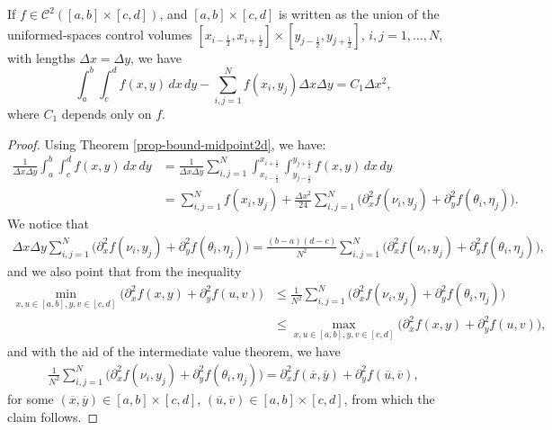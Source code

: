 \begin{corollary}
	\label{anexo-mdp-2d}
	If $f\in \mathcal{C}^2([a,b]\times[c,d])$, and $[a,b]\times[c,d]$ is written
	as the union of the uniformed-spaces control volumes $[x_{i-\frac{1}{2}},x_{i+\frac{1}{2}}] \times  [y_{j-\frac{1}{2}},y_{j+\frac{1}{2}}]$,
	$i,j=1, \ldots, N$,
	with lengths $\Delta x= \Delta y$, we have
	\begin{equation}
	\int_{a}^{b}\int_{c}^{d}
	{f(x,y)\,dx \,dy}-\sum_{i,j=1}^Nf(x_i,y_j) {\Delta x \Delta y} = C_1 \Delta x^2, 
\end{equation}
where $C_1$ depends only on $f$.
\end{corollary}
\begin{proof}
Using Theorem \ref{prop-bound-midpoint2d}, we have:
\begin{align*}
\frac{1}{\Delta x \Delta y}
\int_{a}^{b}\int_{c}^{d} {f(x,y)\,dx \,dy} &=
\frac{1}{\Delta x \Delta y} \sum_{i,j=1}^N
\int_{x_{i-\frac{1}{2}}}^{x_{i+\frac{1}{2}}}
\int_{y_{j-\frac{1}{2}}}^{y_{j+\frac{1}{2}}} {f(x,y)\,dx \,dy}\\
 &= 
\sum_{i,j=1}^N {f(x_i,y_j)} +
\frac{\Delta x^2}{24} \sum_{i,j=1}^N  \bigg({\partial^2_x f(\nu_i,y_j)}+{\partial^2_y f(\theta_i, \eta_j)}\bigg).
\end{align*}
We notice that
\begin{align*}
{\Delta x \Delta y}
\sum_{i,j=1}^N \bigg(\partial^2_x f(\nu_i,y_j)+\partial^2_y f(\theta_i, \eta_j)\bigg) = 
\frac{(b-a)(d-c)}{N^2}
\sum_{i,j=1}^N \bigg(\partial^2_x f(\nu_i,y_j)+\partial^2_y f(\theta_i, \eta_j)\bigg),
\end{align*}
and we also point that from the inequality
\begin{align*}
	\min_{x,u\in[a,b], y,v\in[c,d]}{ \big(\partial^2_x f(x,y) +\partial^2_y f(u,v)\big)}&\leq
	\frac{1}{N^2}
	\sum_{i,j=1}^N \bigg(\partial^2_x f(\nu_i,y_j)+\partial^2_y f(\theta_i, \eta_j)\bigg) \\
	&\leq \max_{x,u\in[a,b], y,v\in[c,d]}{ \big(\partial^2_x f(x,y) +\partial^2_y f(u,v) \big)} ,
\end{align*}
and with the aid of the intermediate value theorem, we have
\begin{align*}
	\frac{1}{N^2}
	\sum_{i,j=1}^N \bigg(\partial^2_x f(\nu_i,y_j)+\partial^2_y f(\theta_i, \eta_j)\bigg) 
	= \partial^2_x f(\overline{x},\overline{y}) +\partial^2_y f(\overline{u},\overline{v}),
\end{align*}
for some $(\overline{x},\overline{y}) \in [a,b]\times[c,d]$, $(\overline{u},\overline{v}) \in [a,b]\times[c,d]$, from which the claim follows.
\end{proof}

